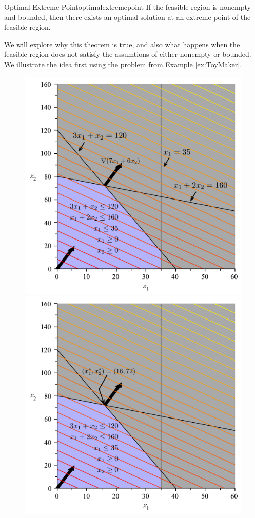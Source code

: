 \begin{theorem}{Optimal Extreme Point}{optimalextremepoint}
If the feasible region is nonempty and bounded, then there exists an optimal solution at an extreme point of the feasible region.
\end{theorem}

We will explore why this theorem is true, and also what happens when the feasible region does not satisfy the assumtions of either nonempty or bounded.
We illustrate the idea first using the problem from Example \ref{ex:ToyMaker}.

\begin{figure}[H] 
\centering
\includegraphics[scale=0.4]{FeasibleRegion.pdf}
\includegraphics[scale=0.4]{FeasibleRegionWithMax.pdf}

\end{figure}
